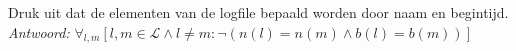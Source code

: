 
\item Druk uit dat de elementen van de logfile bepaald worden door naam en begintijd. \\


\emph{Antwoord:} $ \forall_{l,m} [l,m \in \mathcal{L} \land l \neq m : \neg(n(l) = n(m) \wedge b(l) = b(m))]$  \\


